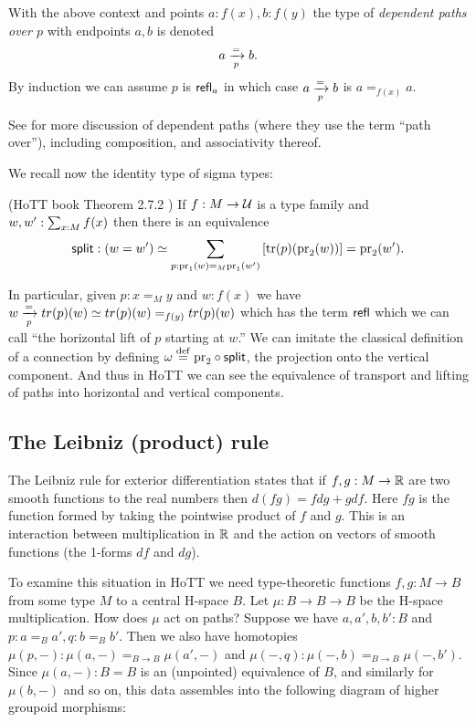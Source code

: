\begin{mydef}
With the above context and points \( a:f(x), b:f(y) \) the type of \emph{dependent paths over \( p \)} with endpoints \( a, b \) is denoted
\[ a\xrightarrow[{p}]{=}b.
\]
By induction we can assume \( p \) is \( \mathsf{refl}_a \) in which case \( a\xrightarrow[{p}]{=}b \) is \( a=_{f(x)}a \).
\end{mydef}

See \cite{Symmetry} for more discussion of dependent paths (where they use the term ``path over''), including composition, and associativity thereof.

We recall now the identity type of sigma types:

\begin{mythm}\label{thm:idsit}
(HoTT book Theorem 2.7.2 \cite{hottbook}) If \( f:M\to \mathcal{U} \) is a type family and \( w,w':\sum_{x:M}f(x) \) then there is an equivalence 
\[ 
\mathsf{split}:(w=w')\simeq \sum_{p:\mathrm{pr}_1(w)=_M\mathrm{pr}_1(w')} \left[\mathrm{tr}(p)(\mathrm{pr}_2(w))\right] = \mathrm{pr}_2(w').
\]
\end{mythm}

In particular, given \( p:x=_M y \) and \( w:f(x) \) we have \( w\xrightarrow[{p}]{=}tr(p)(w)\simeq tr(p)(w)=_{f(y)}tr(p)(w) \) which has the term \( \mathsf{refl} \) which we can call ``the horizontal lift of \( p \) starting at \( w \).'' We can imitate the classical definition of a connection by defining \( \omega\stackrel{\mathrm{def}}{=} \mathrm{pr}_2\circ\mathsf{split} \), the projection onto the vertical component. And thus in HoTT we can see the equivalence of transport and lifting of paths into horizontal and vertical components.

\subsection{The Leibniz (product) rule}

The Leibniz rule for exterior differentiation states that if \( f, g:M\to \mathbb{R} \) are two smooth functions to the real numbers then \( d(fg) = fdg + gdf \). Here \( fg \) is the function formed by taking the pointwise product of \( f \) and \( g \). This is an interaction between multiplication in \( \mathbb{R} \) and the action on vectors of smooth functions (the 1-forms \( df \) and \( dg \)). 

To examine this situation in HoTT we need type-theoretic functions \( f, g:M\to B \) from some type \( M \) to a central H-space \( B \). Let \( \mu:B\to B\to B \) be the H-space multiplication. How does \( \mu \) act on paths? Suppose we have \( a, a', b, b':B \) and \( p:a=_B a', q:b=_B b' \). Then we also have homotopies \( \mu(p, -):\mu(a, -)=_{B\to B}\mu(a', -) \) and \( \mu(-,q):\mu(-,b)=_{B\to B}\mu(-,b'). \) Since \( \mu(a, -):B=B \) is an (unpointed) equivalence of \( B \), and similarly for \( \mu(b, -) \) and so on, this data assembles into the following diagram of higher groupoid morphisms:


